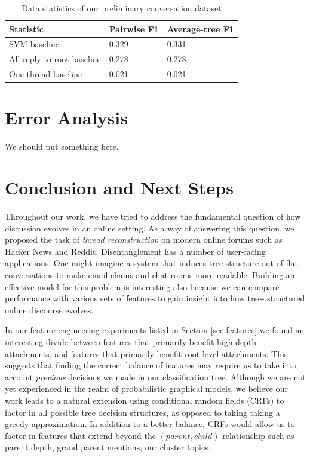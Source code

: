 \documentclass{article}
\begin{document}
\begin{table}[ht]\footnotesize
 \begin{tabular}{| l | l | l |} 
   \hline
   \textbf{Statistic} & Pairwise F1 & Average-tree F1 \\
   \hline
    SVM baseline & 0.329 & 0.331 \\
    All-reply-to-root baseline & 0.278 & 0.278 \\
    One-thread baseline & 0.021 & 0.021 \\
   \hline
  \end{tabular}
  \caption{Data statistics of our preliminary conversation dataset}
  \label{table:results}
\end{table}

\section{Error Analysis}
We should put something here.

\section{Conclusion and Next Steps}
Throughout our work, we have tried to address the fundamental question of how
discussion evolves in an online setting. As a way of answering this question,
we proposed the task of \textit{thread reconstruction} on modern online forums
such as Hacker News and Reddit. Disentanglement has a number of user-facing
applications. One might imagine a system that induces tree structure out of
flat conversations to make email chains and chat rooms more readable. Building
an effective model for this problem is interesting also because we can compare
performance with various sets of features to gain insight into how tree-
structured online discourse evolves.

In our feature engineering experiments listed in Section \ref{sec:features} we
found an interesting divide between features that primarily benefit high-depth
attachments, and features that primarily benefit root-level attachments. This
suggests that finding the correct balance of features may require us to take
into account \textit{previous} decisions we made in our classification tree.
Although we are not yet experienced in the realm of probabilistic graphical
models, we believe our work leads to a natural extension using conditional
random fields (CRFs) to factor in all possible tree decision structures, as
opposed to taking taking a greedy approximation. In addition to a better
balance, CRFs would allow us to factor in features that extend beyond the
$(parent,child)$ relationship such as parent depth, grand parent mentions, our
cluster topics.
\end{document}
